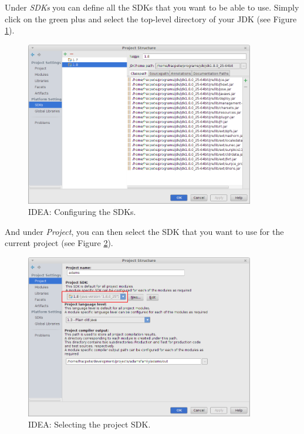 Under \textit{SDKs} you can define all the SDKs that you want to be able to use.
Simply click on the green plus and select the top-level directory of your JDK
(see Figure \ref{intellij-sdks}).
\begin{figure}[htb]
  \centering
  \includegraphics[width=10.0cm]{images/intellij-sdks.png}
  \caption{IDEA: Configuring the SDKs.}
  \label{intellij-sdks}
\end{figure}

And under \textit{Project}, you can then select the SDK that you want to use
for the current project (see Figure \ref{intellij-project-sdk}).
\begin{figure}[htb]
  \centering
  \includegraphics[width=10.0cm]{images/intellij-project-sdk.png}
  \caption{IDEA: Selecting the project SDK.}
  \label{intellij-project-sdk}
\end{figure}

